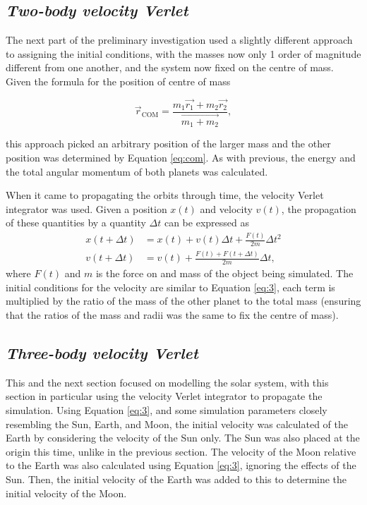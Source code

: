 \documentclass[11pt, english]{report}
\begin{document}
\subsection{\textsl{Two-body velocity Verlet}}
\normalsize{
\noindent The next part of the preliminary investigation used a slightly different approach to assigning the initial conditions, with the masses now only 1 order of magnitude different from one another, and the system now fixed on the centre of mass. Given the formula for the position of centre of mass \cite{bowler_phas0030_nodate}

\begin{equation} \label{eq:com}
    \vec{r}_{\mathrm{COM}} = \frac{m_1\vec{r_1} + m_2\vec{r_2}}{\vec{m_1 + m_2}},
\end{equation}

\noindent this approach picked an arbitrary position of the larger mass and the other position was determined by Equation \ref{eq:com}. As with previous, the energy and the total angular momentum of both planets was calculated.

When it came to propagating the orbits through time, the velocity Verlet integrator \cite{bowler_phas0030_nodate} was used. Given a position $x(t)$ and velocity $v(t)$, the propagation of these quantities by a quantity $\Delta t$ can be expressed as 
\begin{align}
    x(t + \Delta t) &= x(t) + v(t)\Delta t  + \frac{F(t)}{2m} \Delta t^2 \\ 
    v(t + \Delta t) &= v(t) + \frac{F(t) + F(t + \Delta t)}{2m} \Delta t,
\end{align} where $F(t)$ and $m$ is the force on and mass of the object being simulated.
The initial conditions for the velocity are similar to Equation \ref{eq:3}, each term is multiplied by the ratio of the mass of the other planet to the total mass (ensuring that the ratios of the mass and radii was the same to fix the centre of mass). 
}

\subsection{\textsl{Three-body velocity Verlet}}
\normalsize{\noindent This and the next section focused on modelling the solar system, with this section in particular using the velocity Verlet integrator to propagate the simulation. Using Equation \ref{eq:3}, and some simulation parameters closely resembling the Sun, Earth, and Moon, the initial velocity was calculated of the Earth by considering the velocity of the Sun only. The Sun was also placed at the origin this time, unlike in the previous section. The velocity of the Moon relative to the Earth was also calculated using Equation \ref{eq:3}, ignoring the effects of the Sun. Then, the initial velocity of the Earth was added to this to determine the initial velocity of the Moon.}
\end{document}
